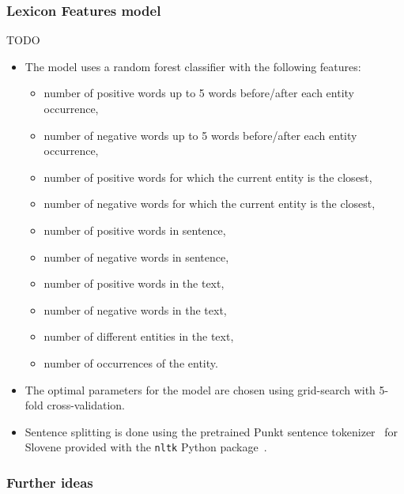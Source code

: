 \documentclass[11pt,a4paper]{article}
\begin{document}
\subsubsection{Lexicon Features model}

TODO
\begin{itemize}
    \item The model uses a random forest classifier with the following features:
    \begin{itemize}
        \item number of positive words up to 5 words before/after each entity occurrence,
        \item number of negative words up to 5 words before/after each entity occurrence,
        \item number of positive words for which the current entity is the closest,
        \item number of negative words for which the current entity is the closest,
        \item number of positive words in sentence,
        \item number of negative words in sentence,
        \item number of positive words in the text,
        \item number of negative words in the text,
        \item number of different entities in the text,
        \item number of occurrences of the entity.
    \end{itemize}
    \item The optimal parameters for the model are chosen using grid-search with 5-fold cross-validation.
    \item Sentence splitting is done using the pretrained Punkt sentence tokenizer~\cite{kiss2006unsupervised} for Slovene provided with the \texttt{nltk} Python package~\cite{bird2009natural}.
\end{itemize}

\subsubsection{Further ideas}
\end{document}
